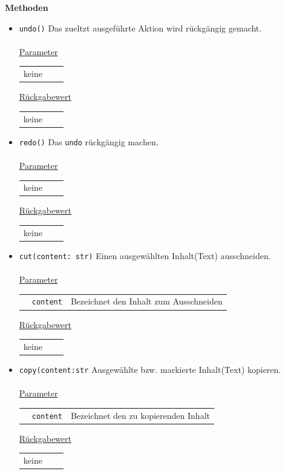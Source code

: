 \documentclass{article}
\begin{document}
\textbf{{Methoden}}
\begin{itemize}
\item \texttt{undo()} \newline Das zueltzt ausgeführte Aktion wird rückgängig gemacht.
\\\\
\underline{{Parameter}} 
\begin{tabular}{lll}
 keine
\end{tabular}

\underline{{Rückgabewert}}
\begin{tabular}{lll}
 keine
\end{tabular}

\item \texttt{redo()} \newline Das \texttt{undo} rückgängig machen. 
\\\\
\underline{{Parameter}} 
\begin{tabular}{lll}
 keine
\end{tabular}

\underline{{Rückgabewert}}
\begin{tabular}{lll}
keine
\end{tabular}

\item \texttt{cut(content: str)} \newline Einen ausgewählten Inhalt(Text) ausschneiden.
\\\\
\underline{{Parameter}} 
\begin{tabular}{lll}
 & \texttt{content} & Bezeichnet den Inhalt zum Ausschneiden\\
\end{tabular}

\underline{{Rückgabewert}}
\begin{tabular}{lll}
keine
\end{tabular}

\item \texttt{copy(content:str} \newline Ausgewählte bzw. markierte Inhalt(Text) kopieren.
\\\\
\underline{{Parameter}} 
\begin{tabular}{lll}
& \texttt{content} & Bezeichnet den zu kopierenden Inhalt \\
\end{tabular}

\underline{{Rückgabewert}}
\begin{tabular}{lll}
keine
\end{tabular}


\end{itemize}
\end{document}

